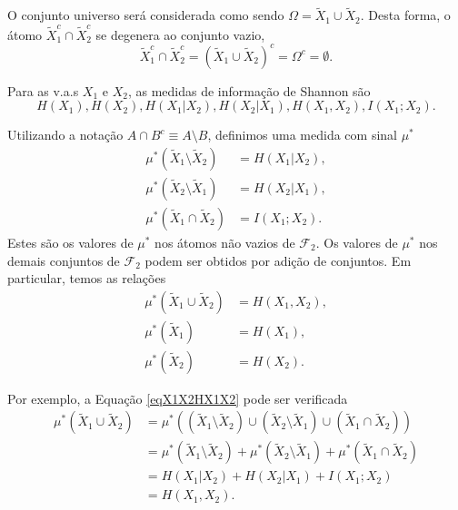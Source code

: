 O conjunto universo será considerada como sendo $\Omega = \tilde{X}_1 \cup \tilde{X}_2$.
  Desta forma, o átomo $\tilde{X}_1^c \cap \tilde{X}_2^c$ se degenera ao conjunto vazio,
  \begin{equation}
  \tilde{X}_1^c \cap \tilde{X}_2^c = (\tilde{X}_1 \cup \tilde{X}_2)^c = \Omega^c = \emptyset .
  \end{equation}

  Para as v.a.s $X_1$ e $X_2$, as medidas de informação de Shannon são
  \begin{equation}
  H(X_1), H(X_2), H(X_1|X_2), H(X_2|X_1), H(X_1,X_2), I(X_1;X_2) .
  \end{equation}

  Utilizando a notação $A \cap B^c \equiv A \setminus B$, definimos uma medida com sinal $\mu^\ast$
  \begin{subequations}
  \begin{align}
  \mu^\ast(\tilde{X}_1 \setminus \tilde{X}_2) &= H(X_1|X_2) ,\\
  \mu^\ast(\tilde{X}_2 \setminus \tilde{X}_1) &= H(X_2|X_1) ,\\
  \mu^\ast(\tilde{X}_1 \cap \tilde{X}_2) &= I(X_1;X_2) .
  \end{align}
  \end{subequations}
  Estes são os valores de $\mu^\ast$ nos átomos não vazios de $\mathcal{F}_2$.
  Os valores de $\mu^\ast$ nos demais conjuntos de $\mathcal{F}_2$ podem ser obtidos por
  adição de conjuntos. Em particular, temos as relações
  \begin{subequations}
  \begin{align}
  \mu^\ast(\tilde{X}_1 \cup \tilde{X}_2) &= H(X_1, X_2) , \label{eqX1X2HX1X2} \\
  \mu^\ast(\tilde{X}_1) &= H(X_1) , \label{eqmuX1HX1}\\
  \mu^\ast(\tilde{X}_2) &= H(X_2) .
  \end{align}
  \end{subequations}

Por exemplo, a Equação \ref{eqX1X2HX1X2} pode ser verificada
\begin{subequations}
  \begin{align}
  \mu^\ast(\tilde{X}_1 \cup \tilde{X}_2) &= \mu^\ast( (\tilde{X}_1 \setminus \tilde{X}_2) \cup (\tilde{X}_2 \setminus \tilde{X}_1) \cup (\tilde{X}_1 \cap \tilde{X}_2) ) \nonumber \\
        &= \mu^\ast( \tilde{X}_1 \setminus \tilde{X}_2 ) + \mu^\ast( \tilde{X}_2 \setminus \tilde{X}_1 ) + \mu^\ast( \tilde{X}_1 \cap \tilde{X}_2 ) \nonumber \\
        &= H(X_1|X_2) + H(X_2|X_1) + I(X_1;X_2) \nonumber \\
        &= H(X_1, X_2) .
  \end{align}
\end{subequations}


